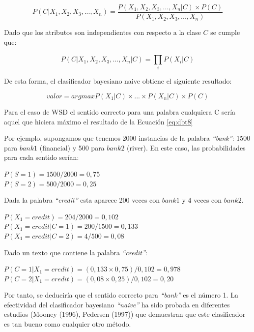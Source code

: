 \begin{itemize}
  \begin{equation}
    P(C|X_1,X_2,X_3,...,X_n)=\frac{P(X_1,X_2,X_3,...,X_n|C)\times P(C)}{P(X_1,X_2,X_3,...,X_n)}
    \label{eq:dbt6}
  \end{equation}

  Dado que los atributos son independientes con respecto a la clase $C$ se cumple que:

  \begin{equation}
    P(C|X_1,X_2,X_3,...,X_n|C)=\prod_{i}^{}P(X_i|C)
    \label{eq:dbt7}
  \end{equation}

  De esta forma, el clasificador bayesiano naive obtiene el siguiente resultado:

  \begin{equation}
    valor=arg max P(X_1|C)\times ... \times P(X_n|C) \times P(C)
    \label{eq:dbt8}
  \end{equation}

  Para el caso de WSD el sentido correcto para una palabra cualquiera C sería aquel que hiciera máximo el resultado de la Ecuación \ref{eq:dbt8}
  
  Por ejemplo, supongamos que tenemos 2000 instancias de la palabra \textit{“bank”}: 1500 para $bank1$ (financial) y 500 para $bank2$ (river). En este caso, las probabilidades para cada sentido serían:
  
  \begin{center}
  $P(S=1)=1500/2000=0,75$\\
  $P(S=2)=500/2000=0,25$
  \end{center}

  Dada la palabra \textit{“credit”} esta aparece 200 veces con $bank1$ y 4 veces con $bank2$.

  \begin{center}
    $P(X_1=credit)=204/2000=0,102$\\
    $P(X_1=credit|C=1)=200/1500=0,133$\\
    $P(X_1=credit|C=2)=4/500=0,08$
  \end{center}

  Dado un texto que contiene la palabra \textit{“credit”}:

  \begin{center}
    $P(C=1|X_1=credit)=(0,133 \times 0,75)/0,102=0,978$\\
    $P(C=2|X_1=credit)=(0,08 \times 0,25)/0,102=0,20$
  \end{center}

  Por tanto, se deduciría que el sentido correcto para \textit{“bank”} es el número 1. La efectividad del clasificador bayesiano \textit{“naive”} ha sido probada en diferentes estudios (Mooney (1996), Pedersen (1997)) que demuestran que este clasificador es tan bueno como cualquier otro método.


\end{itemize}
